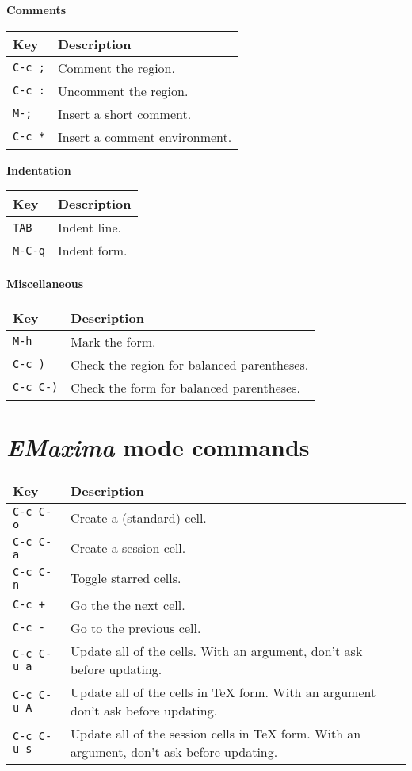 \documentclass{article}
\newcommand{\emx}{\textsl{\sffamily EMaxima}}
\begin{document}
\newpage

\noindent
\textbf{Comments}

\smallskip

\noindent
\begin{tabular}{p{\firstcol}p{\secondcol}}
\hline
\textbf{Key} & \textbf{Description}\\
\hline
\texttt{C-c ;} & Comment the region.\\
\texttt{C-c :} & Uncomment the region.\\
\texttt{M-;} & Insert a short comment.\\
\texttt{C-c *} & Insert a comment environment.
\end{tabular}


\smallskip

\noindent
\textbf{Indentation}

\smallskip

\noindent
\begin{tabular}{p{\firstcol}p{\secondcol}}
\hline
\textbf{Key} & \textbf{Description}\\
\hline
\texttt{TAB} & Indent line.\\
\texttt{M-C-q} & Indent form.
\end{tabular}


\smallskip

\noindent
\textbf{Miscellaneous}

\smallskip

\noindent
\begin{tabular}{p{\firstcol}p{\secondcol}}
\hline
\textbf{Key} & \textbf{Description}\\
\hline
\texttt{M-h} & Mark the form.\\
\texttt{C-c )} & Check the region for balanced parentheses.\\
\texttt{C-c C-)} & Check the form for balanced parentheses.
\end{tabular}

\section{\emx{} mode commands}
\label{app:emx}

\noindent
\begin{tabular}{p{\firstcol}p{\secondcol}}
\hline
\textbf{Key} & \textbf{Description}\\
\hline
\texttt{C-c C-o} & Create a (standard) cell.\\
\texttt{C-c C-a} & Create a session cell.\\
\texttt{C-c C-n} & Toggle starred cells.\\
\texttt{C-c +} & Go the the next cell.\\
\texttt{C-c -} & Go to the previous cell.\\
\texttt{C-c C-u a} & 
Update all of the cells.  With an argument, don't ask before updating.\\
\texttt{C-c C-u A}
& Update all of the cells in \TeX{} form. With an argument don't ask
before updating.\\
\texttt{C-c C-u s}
& Update all of the session cells in \TeX{} form.  With an
argument, don't ask before updating.
\end{tabular}
\end{document}
